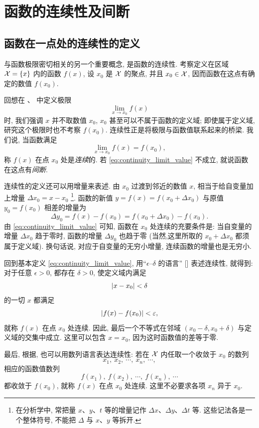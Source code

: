 \section{函数的连续性及间断}\label{sec:continuity_and_discontinuity}
\subsection{函数在一点处的连续性的定义}\label{subsec:66}
与函数极限密切相关的另一个重要概念, 是函数的连续性.
考察定义在区域 $\mathcal{X}=\{x\}$ 内的函数 $f(x)$,
设 $x_0$ 是 $\mathcal{X}$ 的聚点, 并且 $x_0\in\mathcal{X}$, 因而函数在这点有确定的数值 $f(x_0)$.

回想在 、 中定义极限
$$
\lim_{x\to x_0}f(x)
$$
时, 我们强调 $x$ 并不取数值 $x_0$, 
$x_0$ 甚至可以不属于函数的定义域;
即使属于定义域, 研究这个极限时也不考察 $f(x_0)$.
连续性正是将极限与函数值联系起来的桥梁. 我们说, {\kaishu 当函数满足 
\begin{equation}\label{eq:continuity_limit_value}
\lim_{x\to x_0}f(x)=f(x_0),
\end{equation}
称 $f(x)$ 在点 $x_0$ 处是\emph{连续}的.
若 \eqref{eq:continuity_limit_value} 不成立, 就说函数在这点有\emph{间断}.}

连续性的定义还可以用增量来表述.
由 $x_0$ 过渡到邻近的数值 $x$, 相当于给自变量加上增量
$\Delta x_0=x-x_0$
\footnote{在分析学中, 常把量 $x$、$y$、$t$ 等的增量记作
$\Delta x$、$\Delta y$、$\Delta t$ 等.
这些记法各是一个整体符号, 不能把 $\Delta$ 与 $x$、$y$ 等拆开.}.
函数的新值 $y=f(x)=f(x_0+\Delta x_0)$ 与原值 $y_0=f(x_0)$ 相差的增量为
$$
\Delta y_0=f(x)-f(x_0)=f(x_0+\Delta x_0)-f(x_0).
$$
由 \eqref{eq:continuity_limit_value} 可知, 函数在 $x_0$ 处连续的充要条件是:
当自变量的增量 $\Delta x_0$ 趋于零时, 函数的增量 $\Delta y_0$ 也趋于零
(当然,这里所取的 $x_0+\Delta x_0$ 都须属于定义域).
换句话说, {\kaishu 对应于自变量的无穷小增量, 连续函数的增量也是无穷小.}

回到基本定义 \eqref{eq:continuity_limit_value}, 
用“$\epsilon$--$\delta$ 的语言” [] 表述连续性, 就得到:
{\kaishu 对于任意 $\epsilon>0$, 都存在 $\delta>0$, 使定义域内满足
$$
\left| x-x_0 \right|<\delta
$$
的一切 $x$ 都满足
$$
\left| f(x)-f(x_0) \right|<\varepsilon,
$$
就称 $f(x)$ 在点 $x_0$ 处连续.}
因此, 最后一个不等式在邻域 $(x_0-\delta,x_0+\delta)$ 与定义域的交集中成立.
这里可以包含 $x=x_0$, 因为这时函数值的差等于零.

最后, 根据, 也可以用数列语言表达连续性:
{\kaishu 
若在 $\mathcal{X}$ 内任取一个收敛于 $x_0$ 的数列
$$
x_1,\ x_2,\ \cdots,\ x_n,\ \cdots,
$$
相应的函数值数列
$$
f(x_1),\ f(x_2),\ \cdots,\ f(x_n),\ \cdots
$$
都收敛于 $f(x_0)$, 就称 $f(x)$ 在点 $x_0$ 处连续.}
这里不必要求各项 $x_n$ 异于 $x_0$.

